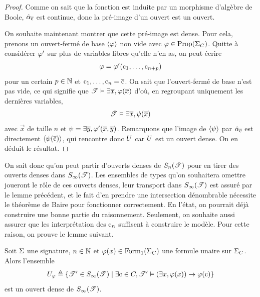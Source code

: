\begin{proof}
  Comme on sait que la fonction est induite par un morphisme d'algèbre de
  Boole, $\hat{\alpha}_{\overline{\mathrm{c}}}$ est continue, donc la pré-image d'un ouvert
  est un ouvert.

  On souhaite maintenant montrer que cette pré-image est dense. Pour cela,
  prenons un ouvert-fermé de base $\langle\varphi\rangle$ non vide avec
  $\varphi\in\operatorname{Prop}(\Sigma_{C})$. Quitte à considérer $\varphi'$ sur plus de
  variables libres qu'elle n'en as, on peut écrire
  \[\varphi = \varphi'(\mathrm{c}_1,\ldots,\mathrm{c}_{n+p})\]
  pour un certain $p \in \mathbb N$ et $\mathrm{c}_1,\ldots,\mathrm{c}_n = \overline{\mathrm{c}}$. On sait que
  l'ouvert-fermé de base n'est pas vide, ce qui signifie que
  $\mathscr T\vDash\exists \overline{x}, \varphi(\overline{x})$ d'où, en regroupant uniquement les
  dernières variables,
  \[\mathscr T\vDash\exists \overline{x},\psi(\overline{x})\]
  avec $\vec x$ de taille $n$ et
  $\psi = \exists \overline{y}, \varphi'(\overline{x},\overline{y})$.
  Remarquons que l'image de $\langle \psi\rangle$ par
  $\hat{\alpha}_{\overline{\mathrm{c}}}$ est directement
  $\langle \psi(\overline{\mathrm{c}})\rangle$, qui rencontre donc $U$ car $U$
  est un ouvert dense. On en déduit le résultat.
\end{proof}

On sait donc qu'on peut partir d'ouverts denses de $S_{n}(\mathscr T)$ pour en
tirer des ouverts denses dans $S_{\infty}(\mathscr T)$. Les ensembles de types qu'on
souhaitera omettre joueront le rôle de ces ouverts denses, leur transport dans
$S_{\infty}(\mathscr T)$ est assuré par le lemme précédent, et le fait d'en
prendre une intersection dénombrable nécessite le théorème de Baire pour
fonctionner correctement. En l'état, on pourrait déjà construire une bonne
partie du raisonnement. Seulement, on souhaite aussi assurer que les
interprétation des $\mathrm{c}_n$ suffisent à construire le modèle. Pour cette raison,
on prouve le lemme suivant.

\begin{proposition}\label{prop.omission.densite}
  Soit $\Sigma$ une signature, $n\in\mathbb N$ et $\varphi(x)\in\operatorname{Form}_1(\Sigma_{C})$
  une formule unaire sur $\Sigma_{C}$. Alors l'ensemble
  \[U_\varphi \triangleq
  \left\{ \mathscr T'\in S_{\infty}(\mathscr T) \;\middle\vert\; \exists \mathrm{c} \in C,\mathscr T'\vDash(\exists x, \varphi(x))\to \varphi(\mathrm{c}) \right\}\]
  est un ouvert dense de $S_{\infty}(\mathscr T)$.
\end{proposition}

